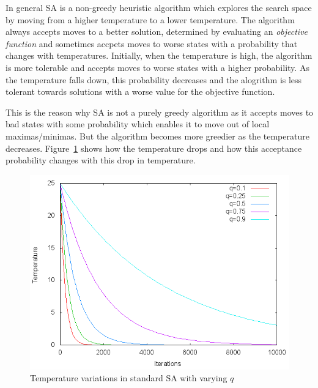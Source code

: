 In general SA is a non-greedy heuristic algorithm which explores the search
space by moving from a higher temperature to a lower temperature. The algorithm
always accepts moves to a better solution, determined by evaluating an
\textit{objective function} and sometimes accpets moves to worse states with a
probability that changes with temperatures. Initially, when the temperature is
high, the algorithm is more tolerable and accepts moves to worse states with a
higher probability. As the temperature falls down, this probability decreases
and the alogrithm is less tolerant towards solutions with a worse value for the
objective function.

This is the reason why SA is not a purely greedy algorithm as it accepts
moves to bad states with some probability which enables it to move out
of local maximas/minimas. But the algorithm becomes more greedier as the
temperature decreases. Figure~\ref{fig:7} shows how the temperature
drops and how this acceptance probability changes with this drop in
temperature.

\begin{figure}[h!]
  \centering
  \includegraphics[scale=0.35]{./figures/temperature-drop}
  \caption{Temperature variations in standard SA with varying $q$}
  \label{fig:7}
\end{figure}

